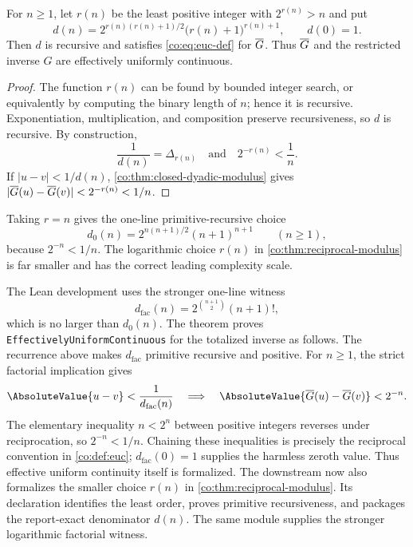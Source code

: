 \begin{theorem}\label{co:thm:reciprocal-modulus}
For $n\ge1$, let $r(n)$ be the least positive integer with $2^{r(n)}>n$ and
put
\begin{equation}\label{co:eq:d-explicit}
 d(n)=2^{r(n)(r(n)+1)/2}\bigl(r(n)+1\bigr)^{r(n)+1},
 \qquad d(0)=1.
\end{equation}
Then $d$ is recursive and satisfies \eqref{co:eq:euc-def} for $\overline G$.
Thus $\overline G$ and the restricted inverse $G$ are effectively uniformly
continuous.
\end{theorem}

\begin{proof}
The function $r(n)$ can be found by bounded integer search, or equivalently by
computing the binary length of $n$; hence it is recursive.  Exponentiation,
multiplication, and composition preserve recursiveness, so $d$ is recursive.
By construction,
\[
 \frac1{d(n)}=\Delta_{r(n)}
 \quad\text{and}\quad
 2^{-r(n)}<\frac1n.
\]
If $|u-v|<1/d(n)$, \cref{co:thm:closed-dyadic-modulus} gives
$|\overline G(u)-\overline G(v)|<2^{-r(n)}<1/n$.
\end{proof}

\begin{remark}
Taking $r=n$ gives the one-line primitive-recursive choice
\[
 d_0(n)=2^{n(n+1)/2}(n+1)^{n+1}\qquad(n\ge1),
\]
because $2^{-n}<1/n$.  The logarithmic choice $r(n)$ in
\cref{co:thm:reciprocal-modulus} is far smaller and has the correct leading
complexity scale.

The Lean development uses the stronger one-line witness
\[
 d_{\mathrm{fac}}(n)=2^{\binom{n+1}{2}}(n+1)!,
\]
which is no larger than $d_0(n)$.  The theorem
 proves
\texttt{EffectivelyUniformContinuous} for the totalized inverse as follows.
The recurrence above makes $d_{\mathrm{fac}}$ primitive recursive and positive.
For $n\ge1$, the strict factorial implication gives
\[
 \AbsoluteValue{u-v}<\frac1{d_{\mathrm{fac}}(n)}
 \quad\Longrightarrow\quad
 \AbsoluteValue{\InvT(u)-\InvT(v)}<2^{-n}.
\]
The elementary inequality $n<2^n$ between positive integers reverses under
reciprocation, so $2^{-n}<1/n$.  Chaining these inequalities is precisely the
reciprocal convention in \cref{co:def:euc}; $d_{\mathrm{fac}}(0)=1$ supplies the
harmless zeroth value.  Thus effective uniform continuity itself is
formalized.  The downstream
 now also formalizes the smaller
choice $r(n)$ in \cref{co:thm:reciprocal-modulus}.  Its declaration
 identifies the least order,
 proves primitive
recursiveness, and
 packages
the report-exact denominator $d(n)$.  The same module supplies the stronger
logarithmic factorial witness.
\end{remark}

